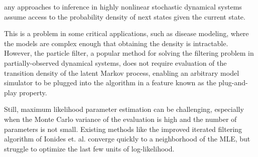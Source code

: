 \documentclass[9pt,twocolumn,twoside]{pnas-new}
\begin{document}


\maketitle
\thispagestyle{firststyle}



any approaches to inference in highly nonlinear stochastic dynamical systems assume access to the probability density of next states given the current state.

This is a problem in some critical applications, such as disease modeling, where the models are complex enough that obtaining the density is intractable. However, the particle filter, a popular method for solving the filtering problem in partially-observed dynamical systems, does not require evaluation of the transition density of the latent Markov process, enabling an arbitrary model simulator to be plugged into the algorithm in a feature known as the plug-and-play property. 

Still, maximum likelihood parameter estimation can be challenging, especially when the Monte Carlo variance of the evaluation is high and the number of parameters is not small. Existing methods like the improved iterated filtering algorithm of Ionides et. al. \cite{Ionides_infpomp} converge quickly to a neighborhood of the MLE, but struggle to optimize the last few units of log-likelihood. 

\end{document}
